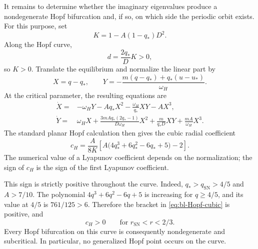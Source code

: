 \documentclass[11pt,reqno]{amsart}
\theoremstyle{plain}
\theoremstyle{definition}
\theoremstyle{remark}
\begin{document}
It remains to determine whether the imaginary eigenvalues produce
a nondegenerate Hopf bifurcation and, if so, on which side the
periodic orbit exists. For this purpose, set
\[
K=1-A(1-q_*)D^2.
\]
Along the Hopf curve,
\[
d=\frac{2q_*}{D}K>0,
\]
so $K>0$. Translate the equilibrium and normalize the linear
part by
\begin{equation}
X=q-q_*,
\qquad
Y
=
-\frac{
m(q-q_*)+q_*(u-u_*)
}{
\omega_H
}.
\label{eq:bl-Hopf-coordinates}
\end{equation}
At the critical parameter, the resulting equations are
\begin{equation}
\begin{aligned}
\dot X
={}&
-\omega_HY
-Aq_*X^2
-\frac{\omega_H}{q_*}XY
-AX^3,
\\
\dot Y
={}&
\omega_HX
+
\frac{
3mAq_*(2q_*-1)
}{
D\omega_H
}X^2
+
\frac{m}{q_*D}XY
+
\frac{mA}{\omega_H}X^3.
\end{aligned}
\label{eq:bl-Hopf-normalization}
\end{equation}
The standard planar Hopf calculation
\cite{kuznetsov2006andronov} then gives the cubic radial
coefficient
\begin{equation}
c_H
=
\frac{A}{8K}
\left[
A\bigl(
4q_*^3+6q_*^2-6q_*+5
\bigr)-2
\right].
\label{eq:bl-Hopf-cubic}
\end{equation}
The numerical value of a Lyapunov coefficient depends on the
normalization; the sign of $c_H$ is the sign of the first
Lyapunov coefficient.

This sign is strictly positive throughout the curve. Indeed,
$q_*>q_{\mathrm{SN}}>4/5$ and $A>7/10$. The polynomial
$4q^3+6q^2-6q+5$ is increasing for $q\geq4/5$, and its value
at $4/5$ is $761/125>6$. Therefore the bracket in
\eqref{eq:bl-Hopf-cubic} is positive, and
\begin{equation}
c_H>0
\qquad
\text{for }
r_{\mathrm{SN}}<r<2/3.
\label{eq:bl-positive-cubic}
\end{equation}
Every Hopf bifurcation on this curve is consequently
nondegenerate and subcritical. In particular, no generalized
Hopf point occurs on the curve.
\end{document}

